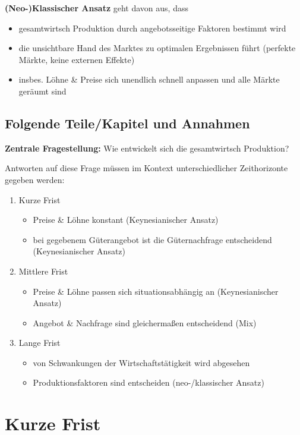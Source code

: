 \documentclass[11pt]{article}
\begin{document}
\textbf{(Neo-)Klassischer Ansatz} geht davon aus, dass
\begin{itemize}
\item gesamtwirtsch Produktion durch angebotsseitige Faktoren bestimmt wird
\item die unsichtbare Hand des Marktes zu optimalen Ergebnissen führt (perfekte Märkte, keine externen Effekte)
\item insbes. Löhne \& Preise sich unendlich schnell anpassen und alle Märkte geräumt sind
\end{itemize}

\subsection{Folgende Teile/Kapitel und Annahmen}
\label{sec:orgc0fc813}
\textbf{Zentrale Fragestellung:} Wie entwickelt sich die gesamtwirtsch Produktion?

Antworten auf diese Frage müssen im Kontext unterschiedlicher Zeithorizonte gegeben werden:
\begin{enumerate}
\item Kurze Frist
\begin{itemize}
\item Preise \& Löhne konstant (Keynesianischer Ansatz)
\item bei gegebenem Güterangebot ist die Güternachfrage entscheidend (Keynesianischer Ansatz)
\end{itemize}
\item Mittlere Frist
\begin{itemize}
\item Preise \& Löhne passen sich situationsabhängig an (Keynesianischer Ansatz)
\item Angebot \& Nachfrage sind gleichermaßen entscheidend (Mix)
\end{itemize}
\item Lange Frist
\begin{itemize}
\item von Schwankungen der Wirtschaftstätigkeit wird abgesehen
\item Produktionsfaktoren sind entscheiden (neo-/klassischer Ansatz)
\end{itemize}
\end{enumerate}

\section{Kurze Frist}
\label{sec:org6eb6b37}
\end{document}
